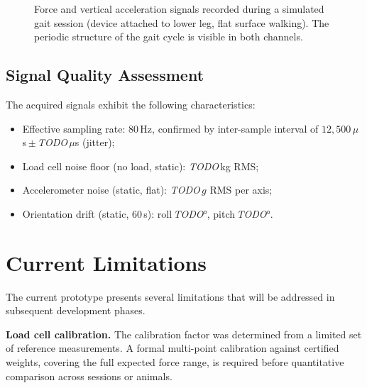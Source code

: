 \begin{figure}[h]
  \centering
  \caption{Force and vertical acceleration signals recorded during a
           simulated gait session (device attached to lower leg, flat
           surface walking). The periodic structure of the gait cycle
           is visible in both channels.}
  \label{fig:simulated_gait}
\end{figure}

\subsection{Signal Quality Assessment}

The acquired signals exhibit the following characteristics:
\begin{itemize}
  \item Effective sampling rate: 80\,Hz, confirmed by inter-sample
      interval of $12{,}500\,\mu$s\,$\pm$\,\textit{TODO}\,$\mu$s (jitter);
  \item Load cell noise floor (no load, static):
      \textit{TODO}\,kg RMS;
  \item Accelerometer noise (static, flat):
      \textit{TODO}\,$g$ RMS per axis;
  \item Orientation drift (static, 60\,s):
      roll\,\textit{TODO}°, pitch\,\textit{TODO}°.
\end{itemize}

\section{Current Limitations}
\label{section:current_limitations}

The current prototype presents several limitations that will be addressed
in subsequent development phases.

\textbf{Load cell calibration.}
The calibration factor was determined from a limited set of reference
measurements.
A formal multi-point calibration against certified weights, covering the
full expected force range, is required before quantitative comparison
across sessions or animals.

